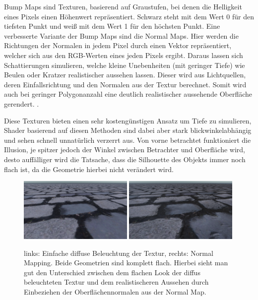 Bump Maps sind Texturen, basierend auf Graustufen, bei denen die Helligkeit eines Pixels
einen Höhenwert repräsentiert. Schwarz steht mit dem Wert 0 für den tiefsten Punkt und weiß mit dem Wert 1 für den höchsten Punkt.
Eine verbesserte Variante der Bump Maps sind die Normal Maps.
Hier werden die Richtungen der Normalen in jedem Pixel durch einen Vektor repräsentiert,
welcher sich aus den RGB-Werten eines jeden Pixels ergibt. Daraus lassen sich Schattierungen simulieren,
welche kleine Unebenheiten (mit geringer Tiefe) wie Beulen oder Kratzer realistischer aussehen lassen.
Dieser wird aus Lichtquellen, deren Einfallsrichtung und den Normalen aus der Textur berechnet.
Somit wird auch bei geringer Polygonanzahl eine deutlich realistischer aussehende Oberfläche gerendert.
\parencite{Cohen1998}.

Diese Texturen bieten einen sehr kostengünstigen
Ansatz um Tiefe zu simulieren, Shader basierend auf diesen Methoden sind dabei aber stark
blickwinkelabhängig und sehen schnell unnatürlich verzerrt aus.
Von vorne betrachtet funktioniert die Illusion, je spitzer jedoch der Winkel zwischen Betrachter und
Oberfläche wird, desto auffälliger wird die Tatsache, dass die Silhouette des Objekts immer
noch flach ist, da die Geometrie hierbei nicht verändert wird.

\begin{figure}[h!t]
	\centering
	\includegraphics[width=0.49\textwidth]{Grafiken/Basics/Mapping/Vergleich_Diffuse.png}
	\includegraphics[width=0.49\textwidth]{Grafiken/Basics/Mapping/Vergleich_Normal.png}
	\begin{footnotesize}
		\caption{links: Einfache diffuse Beleuchtung der Textur, rechts: Normal Mapping. Beide Geometrien sind komplett flach. 
		Hierbei sieht man gut den Unterschied zwischen dem flachen Look
		der diffus beleuchteten Textur und dem realistischeren Aussehen durch Einbeziehen der Oberflächennormalen aus der Normal Map.}
	\end{footnotesize}
\end{figure}

